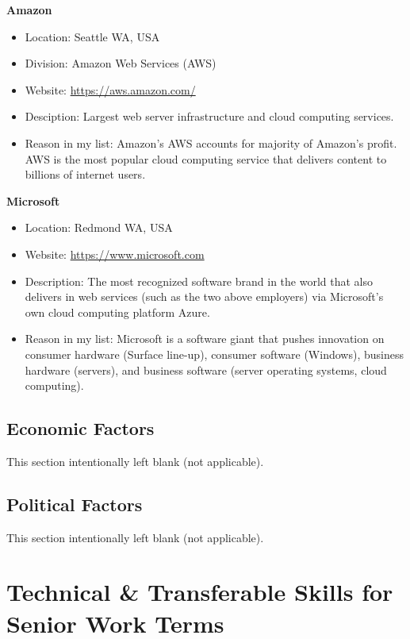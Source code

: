 \documentclass[10pt,letterpaper]{article}
\begin{document}
\textbf{Amazon}
\begin{itemize}
	\item Location: Seattle WA, USA
	\item Division: Amazon Web Services (AWS)
	\item Website: \url{https://aws.amazon.com/}
	\item Desciption: Largest web server infrastructure and cloud computing services.
	\item Reason in my list: Amazon's AWS accounts for majority of Amazon's profit. AWS is the most popular cloud computing service that delivers content to billions of internet users\cite{amazon-revenue, amazon-press, amazon-profit-margin}.
\end{itemize}

\textbf{Microsoft}
\begin{itemize}
	\item Location: Redmond WA, USA
	\item Website: \url{https://www.microsoft.com}
	\item Description: The most recognized software brand in the world that also delivers in web services (such as the two above employers) via Microsoft's own cloud computing platform Azure.
	\item Reason in my list: Microsoft is a software giant that pushes innovation on consumer hardware (Surface line-up), consumer software (Windows), business hardware (servers), and business software (server operating systems, cloud computing).
\end{itemize}

\subsection{Economic Factors}
This section intentionally left blank (not applicable).

\subsection{Political Factors}
This section intentionally left blank (not applicable).

\clearpage
\section{Technical \& Transferable Skills for Senior Work Terms}\label{transferable-skills}

\end{document}
